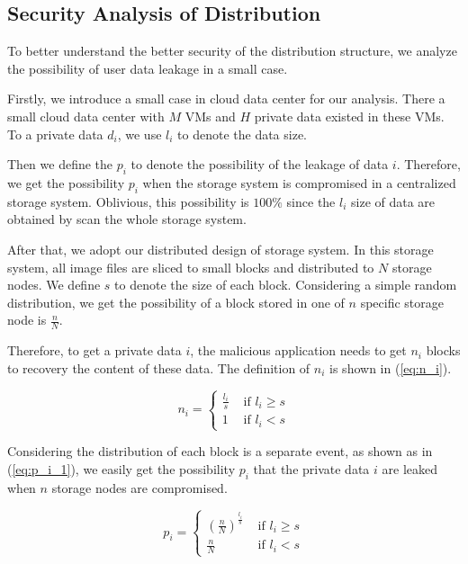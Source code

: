 \documentclass[conference]{IEEEtran}
\begin{document}
\subsection{Security Analysis of Distribution}
To better understand the better security of the distribution structure, we analyze the possibility of user data leakage in a small case. 

Firstly, we introduce a small case in cloud data center for our analysis. There a small cloud data center with $M$ VMs and $H$ private data existed in these VMs. To a private data $d_i$, we use $l_i$ to denote the data size. 

Then we define the $p_i$ to denote the possibility of the leakage of data $i$. Therefore, we get the possibility $p_i$ when the storage system is compromised in a centralized storage system. Oblivious, this possibility is $100\%$ since the $l_i$ size of data are obtained by scan the whole storage system.

After that, we adopt our distributed design of storage system. In this storage system, all image files are sliced to small blocks and distributed to $N$ storage nodes. We define $s$ to denote the size of each block. Considering a simple random distribution, we get the possibility of a block stored in one of $n$ specific storage node is $\frac{n}{N}$. 

Therefore, to get a private data $i$, the malicious application needs to get $n_i$ blocks to recovery the content of these data. The definition of $n_i$ is shown in (\ref{eq:n_i}).

\begin{equation}
\label{eq:n_i}
n_i = \begin{cases}
 \frac{l_i}{s} & \text{ if }  l_i \geq s  \\ 
 1 & \text{ if } l_i < s  
\end{cases}
\end{equation}  

Considering the distribution of each block is a separate event, as shown as in (\ref{eq:p_i_1}), we easily get the possibility $p_i$ that the private data $i$ are leaked when $n$ storage nodes are compromised. 

\begin{equation}
\label{eq:p_i_1}
p_i = \begin{cases}
 (\frac{n}{N})^{\frac{l_i}{s}} & \text{ if }  l_i \geq s  \\ 
 \frac{n}{N} & \text{ if } l_i < s 
 \end{cases} 
\end{equation}
\end{document}
